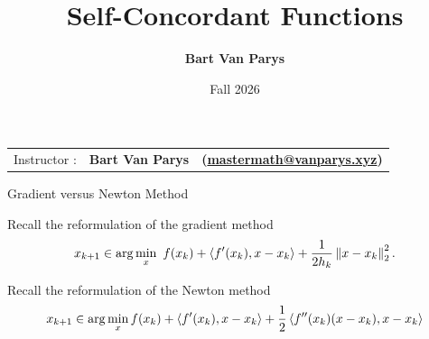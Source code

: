 \documentclass[9pt]{beamer}
\title[Continuous Optimization]{Self-Concordant Functions}
\author[]{\textbf{Bart Van Parys}}
\date{Fall 2026}
\begin{document}
\begin{frame}  

  \maketitle

  \vspace{-2em}
  
    \begin{center}
    \begin{tabular}{lll}
      Instructor : & \textbf{Bart Van Parys} & \textbf{(\href{mailto:mastermath@vanparys.xyz}{mastermath@vanparys.xyz})} \\
    \end{tabular}
  \end{center}
  
\end{frame}

\begin{frame}{Gradient versus Newton Method}

  Recall the reformulation of the gradient method
  \[
    x_{k+1 } \in \arg \min_{x} ~f(x_k) + \left<f'(x_k), x-x_k\right> + \frac{1}{2 h_k} \left\|x - x_k\right\|^2_2. 
  \]

  \vfill

  Recall the reformulation of the Newton method
  \[
    x_{k+1 } \in \arg \min_{x} f(x_k) + \left<f'(x_k), x-x_k\right> + \frac{1}{2} \left<f''(x_k)(x - x_k), x - x_k\right>
  \]
  
\end{frame}
\end{document}

